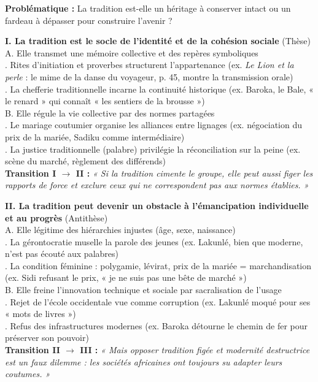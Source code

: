 \documentclass[11pt]{article}
\begin{document}
\begin{exemplebox}
\textbf{Problématique :} La tradition est-elle un héritage à conserver intact ou un fardeau à dépasser pour construire l'avenir ?

\textbf{I. La tradition est le socle de l'identité et de la cohésion sociale} (Thèse)\\
A. Elle transmet une mémoire collective et des repères symboliques\\
. Rites d'initiation et proverbes structurent l'appartenance (ex. \emph{Le Lion et la perle} : le mime de la danse du voyageur, p. 45, montre la transmission orale)\\
. La chefferie traditionnelle incarne la continuité historique (ex. Baroka, le Bale, « le renard » qui connaît « les sentiers de la brousse »)\\
B. Elle régule la vie collective par des normes partagées\\
. Le mariage coutumier organise les alliances entre lignages (ex. négociation du prix de la mariée, Sadiku comme intermédiaire)\\
. La justice traditionnelle (palabre) privilégie la réconciliation sur la peine (ex. scène du marché, règlement des différends)\\
\textbf{Transition I $\rightarrow$ II :} \emph{« Si la tradition cimente le groupe, elle peut aussi figer les rapports de force et exclure ceux qui ne correspondent pas aux normes établies. »}

\textbf{II. La tradition peut devenir un obstacle à l'émancipation individuelle et au progrès} (Antithèse)\\
A. Elle légitime des hiérarchies injustes (âge, sexe, naissance)\\
. La gérontocratie muselle la parole des jeunes (ex. Lakunlé, bien que moderne, n'est pas écouté aux palabres)\\
. La condition féminine : polygamie, lévirat, prix de la mariée = marchandisation (ex. Sidi refusant le prix, « je ne suis pas une bête de marché »)\\
B. Elle freine l'innovation technique et sociale par sacralisation de l'usage\\
. Rejet de l'école occidentale vue comme corruption (ex. Lakunlé moqué pour ses « mots de livres »)\\
. Refus des infrastructures modernes (ex. Baroka détourne le chemin de fer pour préserver son pouvoir)\\
\textbf{Transition II $\rightarrow$ III :} \emph{« Mais opposer tradition figée et modernité destructrice est un faux dilemme : les sociétés africaines ont toujours su adapter leurs coutumes. »}


\end{exemplebox}
\end{document}
